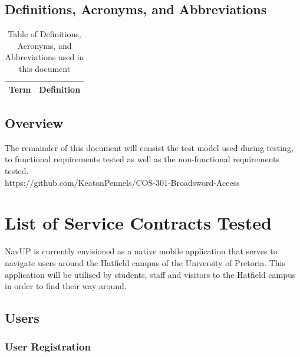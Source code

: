\documentclass[english]{article}
\begin{document}
		\subsection{Definitions, Acronyms, and Abbreviations}\label{subsec:daa}
			\begin{table}[h!]
				\centering
				\caption{Table of Definitions, Acronyms, and Abbreviations used in this document}
				\label{tab: Table 1}
				\begin{tabular}{| m{4cm} | m{12cm} |}
					\hline
					\textbf{Term} & \textbf{Definition} \\
					\hline
					\hline

		
					\hline
					

				\end{tabular}
			\end{table}


		\subsection{Overview}
			The remainder of this document will consist the test model used during testing, to functional requirements tested as well as the non-functional requirements tested.\\


	https://github.com/KeatonPennels/COS-301-Broadsword-Access
		  
	

		\clearpage
	\section{List of Service Contracts Tested}
	NavUP is currently envisioned as a native mobile application that serves to navigate users around the Hatfield campus of the University of Pretoria. This application will be utilised by students, staff and visitors to the Hatfield campus in order to find their way around.\\
	\subsection{Users}
\subsubsection{User Registration}
\end{document}
